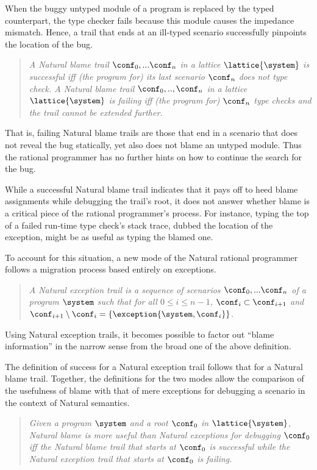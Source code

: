 When the buggy untyped module of a program is replaced by the typed counterpart,
the type checker fails because this module causes the impedance mismatch. Hence, a
trail that ends at an ill-typed scenario successfully pinpoints the location of
the bug. 
\begin{quote}
\it A {\em Natural blame trail\/} $\conf_0,...\conf_n$ in a lattice $\lattice{\system}$ is
\emph{successful}\/ iff (the program for) its last scenario $\conf_n$ does not type check.  A Natural
blame trail $\conf_0,..,\conf_n$ in a lattice $\lattice{\system}$ is \emph{failing\/}
iff (the program for) $\conf_n$ type checks and the trail cannot be extended further.
\end{quote}
That is, failing Natural blame trails are those that end in a scenario that does not reveal the bug statically, yet also does not blame
an untyped module. Thus the rational programmer has
no further hints on how to continue the search for the bug.

While a successful Natural blame trail indicates that it 
pays off to heed blame assignments while debugging the trail's root, it does not answer whether
blame is a critical piece of the rational programmer's process.  For instance,
typing the top of a failed run-time type check's stack trace, dubbed the
location of the exception, might be as useful as typing the blamed one.

To account for this situation, a new mode of the Natural rational
programmer follows a migration process based entirely on exceptions.
\begin{quote}
\it A {\em Natural exception trail\/} is a sequence of scenarios $\conf_0,...\conf_n$ of a
program $\system$ such that for all $0 \leq i \leq n - 1$, $\conf_i \subset
\conf_{i+1}$ and $\conf_{i+1} \setminus \conf_i = \{\exception{\system, \conf_i}\}$.
\end{quote}
Using Natural exception trails, it becomes possible to factor out
``blame information'' in the narrow sense from the broad one of the
above definition. 


The definition of success for a Natural exception trail follows that for
a Natural blame trail.
Together, the definitions for the two modes allow the comparison of the usefulness of blame 
with that of mere exceptions for debugging a scenario in the context of Natural semantics.
\begin{quote}
\it 
  Given a program $\system$ and a root $\conf_0$ in $\lattice{\system}$,
  Natural blame is \emph{more useful\/} than Natural exceptions for
  debugging $\conf_0$ iff 
  the Natural blame trail 
  that starts at $\conf_0$ is successful while the Natural exception trail that
  starts at $\conf_0$ is failing.
\end{quote}
